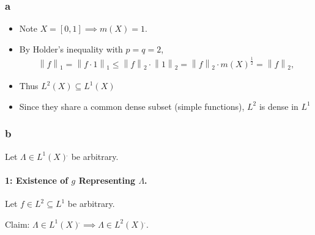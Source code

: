\begin{solution}
\hypertarget{a-17}{%
\subsubsection{a}\label{a-17}}

\begin{itemize}
\item
  Note \(X = [0, 1] \implies m(X) = 1\).
\item
  By Holder's inequality with \(p=q=2\),
  \begin{align*}
  {\left\lVert {f} \right\rVert}_1 = {\left\lVert {f\cdot 1} \right\rVert}_1 \leq {\left\lVert {f} \right\rVert}_2 \cdot {\left\lVert {1} \right\rVert}_2 = {\left\lVert {f} \right\rVert}_2 \cdot m(X)^{\frac 1 2} = {\left\lVert {f} \right\rVert}_2,
  \end{align*}
\item
  Thus \(L^2(X) \subseteq L^1(X)\)
\item
  Since they share a common dense subset (simple functions), \(L^2\) is
  dense in \(L^1\)
\end{itemize}

\hypertarget{b-16}{%
\subsubsection{b}\label{b-16}}

Let \(\Lambda \in L^1(X) {}^{ \check{} }\) be arbitrary.

\hypertarget{existence-of-g-representing-lambda.}{%
\paragraph{\texorpdfstring{1: Existence of \(g\) Representing
\(\Lambda\).}{1: Existence of g Representing \textbackslash Lambda.}}\label{existence-of-g-representing-lambda.}}

Let \(f\in L^2\subseteq L^1\) be arbitrary.

Claim:
\(\Lambda\in L^1(X) {}^{ \check{} }\implies \Lambda \in L^2(X) {}^{ \check{} }\).


\end{solution}
